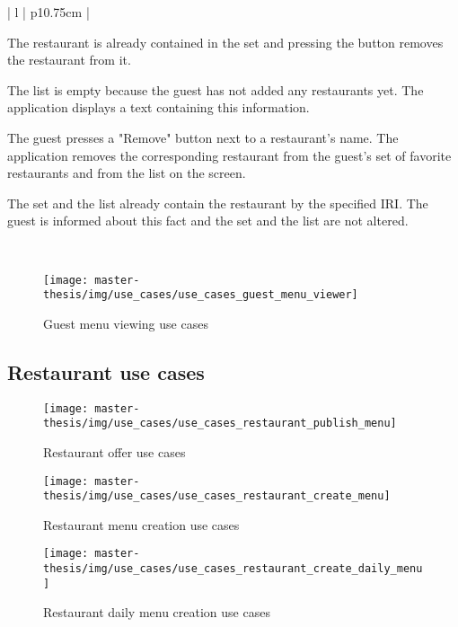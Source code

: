 \begin{center}
\begin{tabular}{| l | p{10.75cm} | }
\begin{minipage}[t]{\linewidth}
\begin{description}[nosep,after=\strut]
        \item [A1.b:] The restaurant is already contained in the set and pressing the button removes the restaurant from it.
        \item [A2:] The list is empty because the guest has not added any restaurants yet. The application displays a text containing this information.
        \item [A3:] The guest presses a "Remove" button next to a restaurant's name. The application removes the corresponding restaurant from the guest's set of favorite restaurants and from the list on the screen.
        \item [A4:] The set and the list already contain the restaurant by the specified IRI. The guest is informed about this fact and the set and the list are not altered.
      \end{description}
    \end{minipage}
    \\
    \hline
  \end{tabular}
  \newline
\end{center}

\newpage

\begin{figure}[h]
  \centering
  \texttt{[image: master-thesis/img/use\_cases/use\_cases\_guest\_menu\_viewer]}
  \caption{Guest menu viewing use cases}
\end{figure}

\subsection{Restaurant use cases}

\begin{figure}[h]
  \centering
  \texttt{[image: master-thesis/img/use\_cases/use\_cases\_restaurant\_publish\_menu]}
  \caption{Restaurant offer use cases}
\end{figure}

\begin{figure}[h]
  \centering
  \texttt{[image: master-thesis/img/use\_cases/use\_cases\_restaurant\_create\_menu]}
  \caption{Restaurant menu creation use cases}
\end{figure}

\begin{figure}[h]
  \centering
  \texttt{[image: master-thesis/img/use\_cases/use\_cases\_restaurant\_create\_daily\_menu]}
  \caption{Restaurant daily menu creation use cases}
\end{figure}

